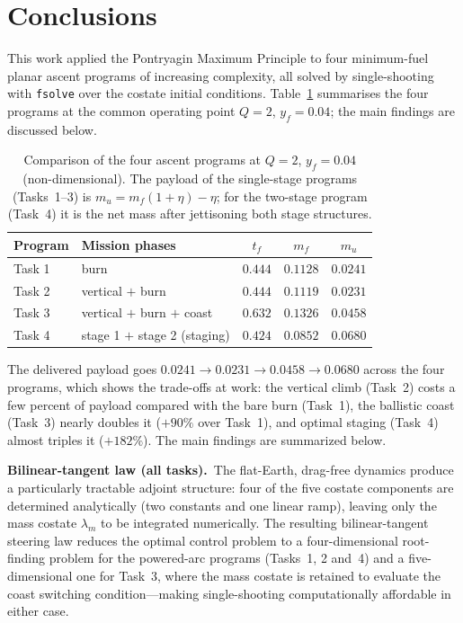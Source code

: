 \documentclass[../main.tex]{subfiles}
\begin{document}
\section{Conclusions}\label{sec:conclusions}

This work applied the Pontryagin Maximum Principle to four minimum-fuel planar ascent programs of increasing complexity, all solved by single-shooting with \texttt{fsolve} over the costate initial conditions. Table~\ref{tab:comparison} summarises the four programs at the common operating point $Q = 2$, $y_f = 0.04$; the main findings are discussed below.

\begin{table}[H]
\centering
\caption{Comparison of the four ascent programs at $Q = 2$, $y_f = 0.04$ (non-dimensional). The payload of the single-stage programs (Tasks~1--3) is $m_u = m_f(1+\eta) - \eta$; for the two-stage program (Task~4) it is the net mass after jettisoning both stage structures.}
\label{tab:comparison}
\begin{tabular}{llccc}
\toprule
Program & Mission phases & $t_f$ & $m_f$ & $m_u$ \\
\midrule
Task 1 & burn                          & $0.444$ & $0.1128$ & $0.0241$ \\
Task 2 & vertical $+$ burn             & $0.444$ & $0.1119$ & $0.0231$ \\
Task 3 & vertical $+$ burn $+$ coast   & $0.632$ & $0.1326$ & $0.0458$ \\
Task 4 & stage 1 $+$ stage 2 (staging) & $0.424$ & $0.0852$ & $0.0680$ \\
\bottomrule
\end{tabular}
\end{table}

The delivered payload goes $0.0241 \to 0.0231 \to 0.0458 \to 0.0680$ across the four programs, which shows the trade-offs at work: the vertical climb (Task~2) costs a few percent of payload compared with the bare burn (Task~1), the ballistic coast (Task~3) nearly doubles it ($+90\%$ over Task~1), and optimal staging (Task~4) almost triples it ($+182\%$). The main findings are summarized below.

\textbf{Bilinear-tangent law (all tasks).}\ The flat-Earth, drag-free dynamics produce a particularly tractable adjoint structure: four of the five costate components are determined analytically (two constants and one linear ramp), leaving only the mass costate $\lambda_m$ to be integrated numerically. The resulting bilinear-tangent steering law reduces the optimal control problem to a four-dimensional root-finding problem for the powered-arc programs (Tasks~1, 2 and~4) and a five-dimensional one for Task~3, where the mass costate is retained to evaluate the coast switching condition---making single-shooting computationally affordable in either case.
\end{document}
